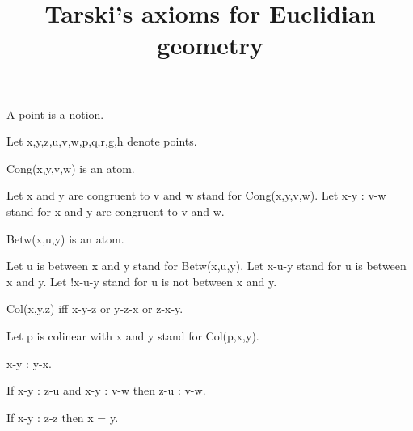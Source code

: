 \documentclass{article}
\title{Tarski's axioms for Euclidian geometry}
\author{}
\date{}
\begin{document}

  \maketitle

  \begin{forthel}




    \begin{signature}
      A point is a notion.
    \end{signature}

    Let x,y,z,u,v,w,p,q,r,g,h denote points.


    \begin{signature}
      Cong(x,y,v,w) is an atom.
    \end{signature}

    Let x and y are congruent to v and w stand for Cong(x,y,v,w).
    Let x-y : v-w stand for x and y are congruent to v and w.

    \begin{signature}
      Betw(x,u,y) is an atom.
    \end{signature}

    Let u is between x and y stand for Betw(x,u,y).
    Let x-u-y stand for u is between x and y.
    Let !x-u-y stand for u is not between x and y.


    \begin{definition}
      Col(x,y,z) iff x-y-z or y-z-x or z-x-y.
    \end{definition}

    Let p is colinear with x and y stand for Col(p,x,y).


    \begin{axiom}[A1]
      x-y : y-x.
    \end{axiom}

    \begin{axiom}[A2]
      If x-y : z-u and x-y : v-w then z-u : v-w.
    \end{axiom}

    \begin{axiom}[A3]
      If x-y : z-z then x = y.
    \end{axiom}


\end{forthel}
\end{document}
